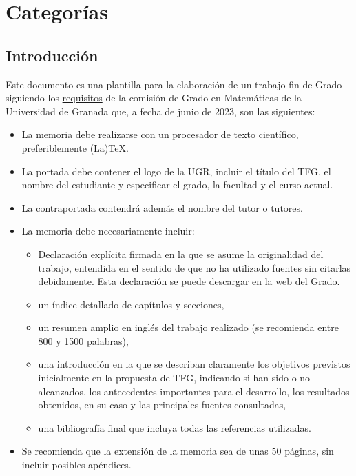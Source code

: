 
\chapter{Categorías}\label{ch:categorias}

\section{Introducción}
Este documento es una plantilla para la elaboración de un trabajo fin de Grado siguiendo los \href{https://grados.ugr.es/matematicas/pages/infoacademica/tfg/requisitosTFG}{requisitos} de la comisión de Grado en Matemáticas de la Universidad de Granada que, a fecha de junio de 2023, son las siguientes:

\begin{itemize}
  \item La  memoria  debe  realizarse  con  un  procesador  de  texto  científico,  preferiblemente (La)TeX.
  \item La portada  debe contener  el  logo  de  la UGR,  incluir  el  título del TFG, el nombre del estudiante y especificar el grado, la facultad y el curso actual.
  \item La contraportada contendrá además el nombre del tutor o tutores.
  \item La memoria debe necesariamente incluir:
    \begin{itemize}
      \item Declaración explícita firmada en la que se asume la originalidad del trabajo, entendida en el sentido de que no ha utilizado fuentes sin citarlas debidamente. Esta declaración se puede descargar en la web del Grado.
      \item un índice detallado de capítulos y secciones,
      \item un resumen amplio en inglés del trabajo realizado (se recomienda entre 800 y 1500 palabras),
      \item una introducción en la que se describan claramente los objetivos previstos inicialmente en la propuesta de TFG, indicando si han sido o no alcanzados, los antecedentes importantes para el desarrollo, los resultados obtenidos, en su caso y las principales fuentes consultadas,
      \item una bibliografía final que incluya todas las referencias utilizadas.
    \end{itemize}
  \item Se recomienda que la extensión de la memoria sea de unas 50 páginas, sin incluir posibles apéndices.
\end{itemize}

